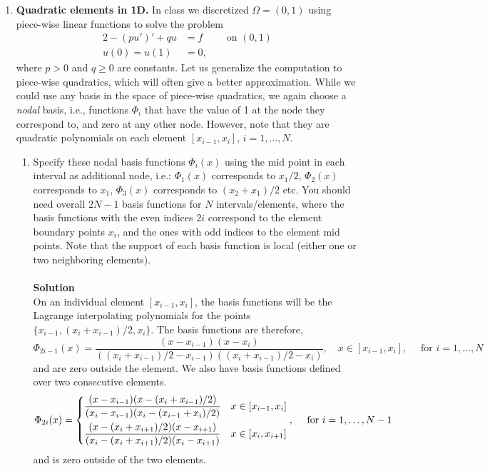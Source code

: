 \documentclass[11pt]{article}
\begin{document}
\begin{enumerate}
\begin{enumerate}
  \end{enumerate}
\item {\bf Quadratic elements in 1D.} In class we discretized
  $\Omega=(0,1)$ using piece-wise linear functions to solve the problem
  \begin{alignat*}{2}
    -(pu')' + q u &= f && \text{ on } (0,1)\\
    u(0)=u(1)&=0,
  \end{alignat*}
  where $p>0$ and $q\ge 0$ are constants. Let us generalize the
  computation to piece-wise quadratics, which will often give a better
  approximation. While we could use any basis in the space of
  piece-wise quadratics, we again choose a \emph{nodal} basis, i.e.,
  functions $\Phi_i$ that have the value of 1 at the node they
  correspond to, and zero at any other node. However, note that they
  are quadratic polynomials on each element $[x_{i-1},x_i]$,
  $i=1,\ldots,N$.
  \begin{enumerate}
    \item Specify these nodal basis functions $\Phi_i(x)$ using the
      mid point in each interval as additional node, i.e.: $\Phi_1(x)$
      corresponds to $x_1/2$, $\Phi_2(x)$ corresponds to $x_1$,
      $\Phi_3(x)$ corresponds to $(x_2+x_1)/2$ etc. You should need
      overall $2N-1$ basis functions for $N$ intervals/elements, where
      the basis functions with the even indices $2i$ correspond to the
      element boundary points $x_i$, and the ones with odd indices to
      the element mid points. Note that the support of each basis
      function is local (either one or two neighboring elements).\\
\\


{\bf Solution}\\
On an individual element $[x_{i-1}, x_i]$, the basis functions will be the Lagrange interpolating polynomials for the points $\{x_{i-1}, (x_{i} + x_{i-1})/2, x_{i}\}$.  The basis functions are therefore,
\[
\Phi_{2i-1}(x) = \frac{(x - x_{i-1})(x - x_i)}{((x_{i} + x_{i-1})/2 - x_{i-1})((x_{i} + x_{i-1})/2 - x_{i})}, \quad x \in [x_{i-1}, x_i],\quad \text{ for } i = 1,\ldots,N
\]
and are zero outside the element. We also have basis functions defined over two consecutive elements.
\[
\Phi_{2i}(x) = \begin{dcases}
\frac{(x - x_{i-1})(x - (x_{i} + x_{i-1})/2)}{(x_i - x_{i-1})(x_i - (x_{i-1} + x_i)/2)} & x \in [x_{i-1}, x_{i}]\\
\frac{(x - (x_{i} + x_{i+1})/2)(x - x_{i+1})}{(x_{i} - (x_{i} + x_{i+1})/2)(x_{i} - x_{i+1})}			& x \in [x_{i}, x_{i+1}]
\end{dcases}, \quad \text{ for } i = 1,\ldots,N-1
\]
and is zero outside of the two elements.



\end{enumerate}
\end{enumerate}
\end{document}
